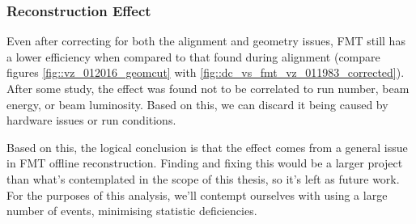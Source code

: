 \subsubsection{Reconstruction Effect}
\label{sssec::reconstruction_effect}
    Even after correcting for both the alignment and geometry issues, FMT still has a lower efficiency when compared to that found during alignment (compare figures \ref{fig::vz_012016_geomcut} with \ref{fig::dc_vs_fmt_vz_011983_corrected}).
    After some study, the effect was found not to be correlated to run number, beam energy, or beam luminosity.
    Based on this, we can discard it being caused by hardware issues or run conditions.

    Based on this, the logical conclusion is that the effect comes from a general issue in FMT offline reconstruction.
    Finding and fixing this would be a larger project than what's contemplated in the scope of this thesis, so it's left as future work.
    For the purposes of this analysis, we'll contempt ourselves with using a large number of events, minimising statistic deficiencies.
